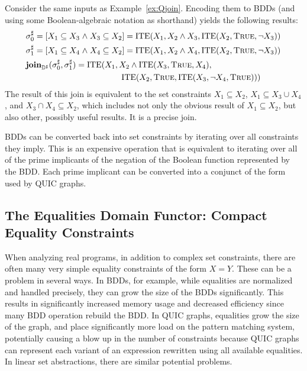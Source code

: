 \begin{example}  Consider the same inputs as Example~\ref{ex:Qjoin}.  Encoding them to BDDs (and using some Boolean-algebraic notation as shorthand) yields the following results:
\begin{align*}
  & {\sigma}^{\sharp}_0 = [{X_1 \subseteq X_3 \mathrel{\wedge} X_3 \subseteq X_2}] = \textrm{ITE}(X_1, X_2 \wedge X_3, \textrm{ITE}(X_2, \textsc{True}, \neg X_3)) \\
  & {\sigma}^{\sharp}_1 = [{X_1 \subseteq X_4 \mathrel{\wedge} X_4 \subseteq X_2}] = \textrm{ITE}(X_1, X_2 \wedge X_4, \textrm{ITE}(X_2, \textsc{True}, \neg X_3)) \\
  & \textbf{join}_{{\mathbb{D}}^{\sharp}}({\sigma}^{\sharp}_0, {\sigma}^{\sharp}_1 ) = \textrm{ITE}(X_1, X_2 \wedge \textrm{ITE}(X_3, \textsc{True}, X_4), \\
  & \qquad \qquad \qquad \qquad \qquad \quad \;\; \textrm{ITE}(X_2, \textsc{True}, \textrm{ITE}(X_3, \neg X_4, \textsc{True})))
\end{align*}
  The result of this join is equivalent to the set constraints $X_1 \subseteq X_2$, $X_1 \subseteq X_3 \cup X_4$, and $X_3 \cap X_4 \subseteq X_2$, which includes not only the obvious result of $X_1 \subseteq X_2$, but also other, possibly useful results.  It is a precise join.
\end{example}

BDDs can be converted back into set constraints by iterating over all constraints they imply.  This is an expensive operation that is equivalent to iterating over all of the prime implicants of the negation of the Boolean function represented by the BDD.  Each prime implicant can be converted into a conjunct of the form used by QUIC graphs.

\subsection{The Equalities Domain Functor: Compact Equality Constraints}
\label{s:4:4:eqs}
\newcommand{\eqrep}{\ensuremath{Q}}

When analyzing real programs, in addition to complex set constraints, there are often many very simple equality constraints of the form $X = Y$.  These can be a problem in several ways.  In BDDs, for example, while equalities are normalized and handled precisely, they can grow the size of the BDDs significantly.  This results in significantly increased memory usage and decreased efficiency since many BDD operation rebuild the BDD.  In QUIC graphs, equalities grow the size of the graph, and place significantly more load on the pattern matching system, potentially causing a blow up in the number of constraints because QUIC graphs can represent each variant of an expression rewritten using all available equalities.  In linear set abstractions, there are similar potential problems.

